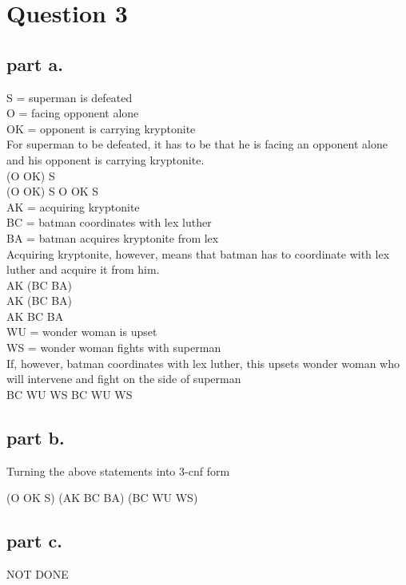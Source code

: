 \section{Question 3}



\subsection{part a.}
S = superman is defeated \\
O = facing opponent alone \\
OK = opponent is carrying kryptonite \\

For superman to be defeated, it has to be that he is facing an opponent alone and his opponent is carrying kryptonite. \\
(O \land OK) \to S \\
\neg (O \land OK) \lor S
\neg O \lor \neg OK \lor S \\


AK = acquiring kryptonite \\
BC = batman coordinates with lex luther \\
BA = batman acquires kryptonite from lex \\

Acquiring kryptonite, however, means that batman has to coordinate with lex luther and
acquire it from him. \\

AK \to (BC \land BA) \\
\neg AK \lor (BC \land BA) \\
\neg AK \lor \neg BC \lor \neg BA \\

WU = wonder woman is upset \\
WS = wonder woman fights with superman \\

If, however, batman coordinates with lex luther, this upsets wonder woman who will intervene and fight on the side of superman\\
BC \to WU \land WS
\neg BC \lor WU \lor WS

\subsection{part b.}
Turning the above statements into 3-cnf form

(\neg O \lor \neg OK \lor S) \land (\neg AK \lor \neg BC \lor \neg BA) \land (\neg BC \lor WU \lor WS)

\subsection{part c.}
NOT DONE
